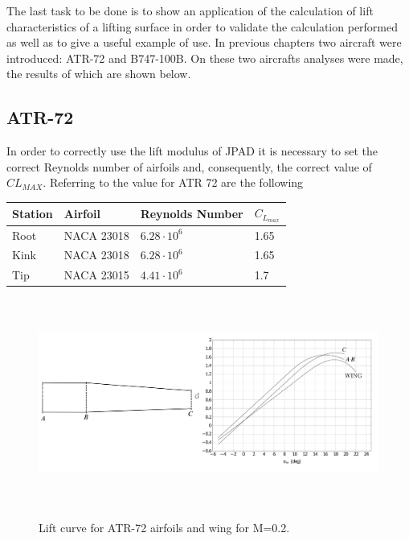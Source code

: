 The last task to be done is to show an application of the calculation of lift characteristics of a lifting surface in order to validate the calculation performed as well as to give a useful example of use. In previous chapters two aircraft were introduced: ATR-72 and B747-100B. On these two aircrafts analyses were made, the results of which are shown below.\\

\subsection{ATR-72}

In order to correctly use the lift modulus of JPAD it is necessary to set the correct Reynolds number of airfoils and, consequently, the correct value of $CL_{MAX}$. Referring to \cite{Abbott} the value for ATR 72 are the following

\begin{center}
	\begin{tabular}{ | l | l | l | l |}
		\hline
		Station & Airfoil & Reynolds Number & $C_{L_{max}}$ \\ \hline
		Root & NACA 23018 & $6.28 \cdot 10^6$ & 1.65 \\ \hline
		Kink & NACA 23018 &  $6.28 \cdot 10^6$ & 1.65 \\ \hline
		Tip & NACA 23015 & $4.41 \cdot 10^6$ & 1.7 \\
		\hline
	\end{tabular}
\end{center}


\begin{figure}[H]
	\centering
	{\includegraphics[height=6.8cm]{Immagini/ATR_Topview.pdf}} 
	\caption{Lift curve for ATR-72 airfoils and wing for M=0.2.}
	\label{fig:clalf}
\end{figure}

